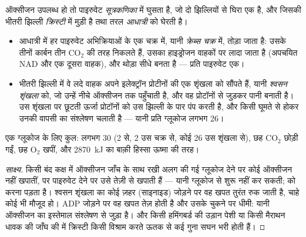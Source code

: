 \begin{proposition}\label{prop:g12:respiration-fermentation:mitochondrion}
ऑक्सीजन उपलब्ध हो तो पाइरुवेट \emph{सूत्रकणिका} में घुसता
है, जो दो झिल्लियों से घिरा एक  है, और जिसकी भीतरी झिल्ली
\emph{क्रिस्टी} में मुड़ी है तथा तरल \emph{आधात्री} को घेरती है।
\begin{itemize}
  \item आधात्री में हर पाइरुवेट अभिक्रियाओं के एक चक्र में, यानी
        \emph{क्रेब्स चक्र} में, तोड़ा जाता है: उसके
        तीनों कार्बन तीन $\mathrm{CO_2}$ की तरह निकलते हैं, उसका हाइड्रोजन
        वाहकों पर लादा जाता है (अपचयित NAD और एक दूसरा वाहक), और थोड़ा 
        सीधे बनता है --- प्रति पाइरुवेट एक।
  \item भीतरी झिल्ली में वे लदे वाहक अपने इलेक्ट्रॉन प्रोटीनों की एक
        शृंखला को सौंपते हैं, यानी \emph{श्वसन शृंखला} को, जो उन्हें नीचे
        ऑक्सीजन तक पहुँचाती है, और वह प्रोटॉनों से जुड़कर पानी बनाती है।
        उस शृंखला पर छूटती ऊर्जा प्रोटॉनों को उस झिल्ली के पार पंप करती है,
        और किसी घूमते  से होकर उनकी वापसी  का संश्लेषण चलाती है
        --- यानी प्रति ग्लूकोज लगभग 26।
\end{itemize}
एक ग्लूकोज के लिए कुल: लगभग 30  (2  से, 2 उस चक्र से, कोई 26
उस शृंखला से), छह $\mathrm{CO_2}$ छोड़ी गईं, छह $\mathrm{O_2}$ खपीं, और
\qty{2870}{kJ} का बाक़ी हिस्सा ऊष्मा की तरह।
\end{proposition}
\begin{proof}[साक्ष्य]
किसी बंद कक्ष में ऑक्सीजन जाँच के साथ रखी अलग की गई  ग्लूकोज
देने पर कोई ऑक्सीजन नहीं खपातीं, पर पाइरुवेट देने पर उसे तेज़ी से खपाती हैं
--- यानी  ग्लूकोज से शुरू नहीं कर सकती;  को करना पड़ता
है। श्वसन शृंखला का कोई ज़हर (साइनाइड) जोड़ने पर वह खपत तुरंत रुक जाती है,
चाहे कोई भी  मौजूद हो। ADP जोड़ने पर वह खपत तेज़ होती है और उसके
चुकने पर धीमी: यानी ऑक्सीजन का इस्तेमाल  संश्लेषण से जुड़ा है। और किसी
हमिंगबर्ड की उड़ान पेशी या किसी मैराथन धावक की जाँघ की  में
क्रिस्टी किसी विश्राम करते ऊतक से कई गुना सघन भरी होती हैं।
\end{proof}

